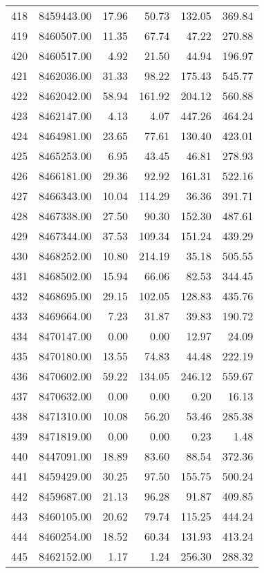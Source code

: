 \begin{table}[ht]
\begin{tabular}{rrrrrr}
  418 & 8459443.00 & 17.96 & 50.73 & 132.05 & 369.84 \\ 
  419 & 8460507.00 & 11.35 & 67.74 & 47.22 & 270.88 \\ 
  420 & 8460517.00 & 4.92 & 21.50 & 44.94 & 196.97 \\ 
  421 & 8462036.00 & 31.33 & 98.22 & 175.43 & 545.77 \\ 
  422 & 8462042.00 & 58.94 & 161.92 & 204.12 & 560.88 \\ 
  423 & 8462147.00 & 4.13 & 4.07 & 447.26 & 464.24 \\ 
  424 & 8464981.00 & 23.65 & 77.61 & 130.40 & 423.01 \\ 
  425 & 8465253.00 & 6.95 & 43.45 & 46.81 & 278.93 \\ 
  426 & 8466181.00 & 29.36 & 92.92 & 161.31 & 522.16 \\ 
  427 & 8466343.00 & 10.04 & 114.29 & 36.36 & 391.71 \\ 
  428 & 8467338.00 & 27.50 & 90.30 & 152.30 & 487.61 \\ 
  429 & 8467344.00 & 37.53 & 109.34 & 151.24 & 439.29 \\ 
  430 & 8468252.00 & 10.80 & 214.19 & 35.18 & 505.55 \\ 
  431 & 8468502.00 & 15.94 & 66.06 & 82.53 & 344.45 \\ 
  432 & 8468695.00 & 29.15 & 102.05 & 128.83 & 435.76 \\ 
  433 & 8469664.00 & 7.23 & 31.87 & 39.83 & 190.72 \\ 
  434 & 8470147.00 & 0.00 & 0.00 & 12.97 & 24.09 \\ 
  435 & 8470180.00 & 13.55 & 74.83 & 44.48 & 222.19 \\ 
  436 & 8470602.00 & 59.22 & 134.05 & 246.12 & 559.67 \\ 
  437 & 8470632.00 & 0.00 & 0.00 & 0.20 & 16.13 \\ 
  438 & 8471310.00 & 10.08 & 56.20 & 53.46 & 285.38 \\ 
  439 & 8471819.00 & 0.00 & 0.00 & 0.23 & 1.48 \\ 
  440 & 8447091.00 & 18.89 & 83.60 & 88.54 & 372.36 \\ 
  441 & 8459429.00 & 30.25 & 97.50 & 155.75 & 500.24 \\ 
  442 & 8459687.00 & 21.13 & 96.28 & 91.87 & 409.85 \\ 
  443 & 8460105.00 & 20.62 & 79.74 & 115.25 & 444.24 \\ 
  444 & 8460254.00 & 18.52 & 60.34 & 131.93 & 413.24 \\ 
  445 & 8462152.00 & 1.17 & 1.24 & 256.30 & 288.32 \\ 

\end{tabular}
\end{table}
